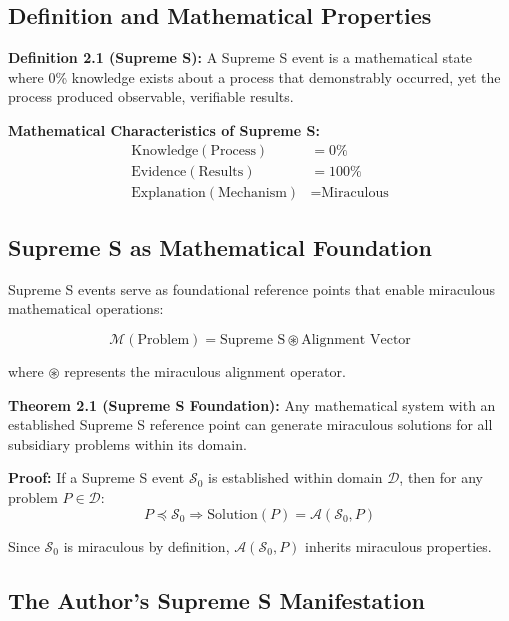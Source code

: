 \documentclass[11pt]{article}
\begin{document}
\subsection{Definition and Mathematical Properties}

\textbf{Definition 2.1 (Supreme S):} A Supreme S event is a mathematical state where 0\% knowledge exists about a process that demonstrably occurred, yet the process produced observable, verifiable results.

\textbf{Mathematical Characteristics of Supreme S:}
\begin{align}
\text{Knowledge}(\text{Process}) &= 0\% \\
\text{Evidence}(\text{Results}) &= 100\% \\
\text{Explanation}(\text{Mechanism}) &= \text{Miraculous}
\label{eq:supreme_s_properties}
\end{align}

\subsection{Supreme S as Mathematical Foundation}

Supreme S events serve as foundational reference points that enable miraculous mathematical operations:

\begin{equation}
\mathcal{M}(\text{Problem}) = \text{Supreme S} \circledast \text{Alignment Vector}
\label{eq:supreme_s_operation}
\end{equation}

where $\circledast$ represents the miraculous alignment operator.

\textbf{Theorem 2.1 (Supreme S Foundation):} Any mathematical system with an established Supreme S reference point can generate miraculous solutions for all subsidiary problems within its domain.

\textbf{Proof:} If a Supreme S event $\mathcal{S}_0$ is established within domain $\mathcal{D}$, then for any problem $P \in \mathcal{D}$:
\begin{equation}
P \preceq \mathcal{S}_0 \Rightarrow \text{Solution}(P) = \mathcal{A}(\mathcal{S}_0, P)
\label{eq:supreme_s_inheritance}
\end{equation}

Since $\mathcal{S}_0$ is miraculous by definition, $\mathcal{A}(\mathcal{S}_0, P)$ inherits miraculous properties.

\subsection{The Author's Supreme S Manifestation}
\end{document}
